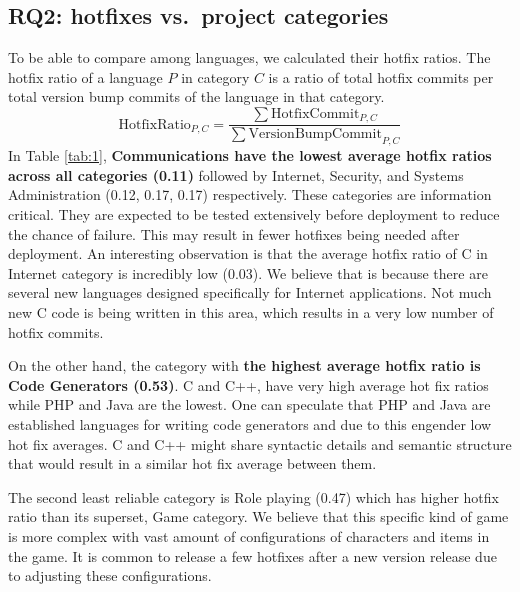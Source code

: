 \documentclass{sig-alternate}
\begin{document}
\subsection{RQ2: hotfixes vs.\ project categories}
To be able to compare among languages, we calculated their hotfix ratios. The hotfix ratio of a language $P$ in category $C$ is a ratio of total hotfix commits per total version bump commits of the language in that category. %
\begin{equation*}
\mathrm{HotfixRatio}_{P,C} = \frac{\sum{\mathrm{HotfixCommit}_{P,C}}}{\sum{\mathrm{VersionBumpCommit}_{P,C}}}
\end{equation*}
In Table \ref{tab:1}, \textbf{Communications have the lowest average hotfix ratios across all categories (0.11)} followed by Internet, Security, and Systems Administration (0.12, 0.17, 0.17) respectively. These categories are information critical. They are expected to be tested extensively before deployment to reduce the chance of failure. This may result in fewer hotfixes being needed after deployment. An interesting observation is that the average hotfix ratio of C in Internet category is incredibly low (0.03). We believe that is because there are several new languages designed specifically for Internet applications. Not much new C code is being written in this area, which results in a very low number of hotfix commits. %

On the other hand, the category with \textbf{the highest average hotfix ratio is Code Generators (0.53)}. C and C++, have very high average hot fix ratios while  PHP and Java are the lowest. One can speculate that PHP and Java are established languages for writing code generators and due to this engender low hot fix averages. C and C++ might share syntactic details and semantic structure that would result in a similar hot fix average between them. 

The second least reliable category is Role playing (0.47) which has higher hotfix ratio than its superset, Game category. We believe that this specific kind of game is more complex with vast amount of configurations of characters and items in the game. It is common to release a few hotfixes after a new version release due to adjusting these configurations. %
\end{document}
